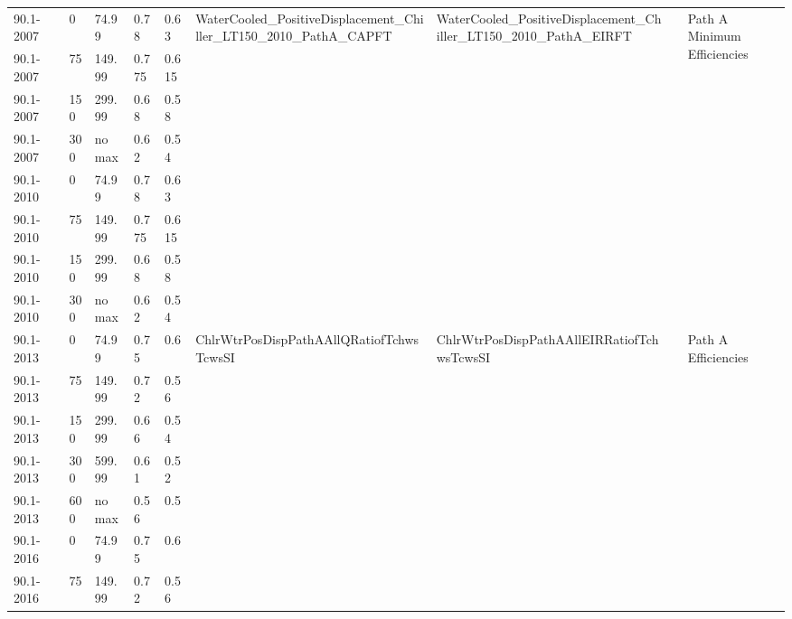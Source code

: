 \begin{table}
\begin{tabular}{|p{0.5in}|p{0.5in}|p{0.4in}|p{0.4in}|p{0.4in}|p{0.4in}|p{0.5in}|p{0.5in}|p{0.5in}|p{0.4in}|}
90.1-2007 &  & 0 & 74.99 & 0.78 & 0.63 &
  \multirow{8}{*}{\parbox{0.5in}{WaterCooled\_PositiveDisplacement\_Chiller\_LT150\_2010\_PathA\_CAPFT}} &
  \multirow{8}{*}{\parbox{0.5in}{WaterCooled\_PositiveDisplacement\_Chiller\_LT150\_2010\_PathA\_EIRFT}} &
   &
  \multirow{8}{*}{\parbox{0.5in}{Path   A Minimum Efficiencies}} \\ \cline{1-1} \cline{3-6}
90.1-2007           &  & 75  & 149.99 & 0.775 & 0.615 &  &  &  &                                        \\ \cline{1-1} \cline{3-6}
90.1-2007           &  & 150 & 299.99 & 0.68  & 0.58  &  &  &  &                                        \\ \cline{1-1} \cline{3-6}
90.1-2007           &  & 300 & no max   & 0.62  & 0.54  &  &  &  &                                        \\ \cline{1-1} \cline{3-6}
90.1-2010           &  & 0   & 74.99  & 0.78  & 0.63  &  &  &  &                                        \\ \cline{1-1} \cline{3-6}
90.1-2010           &  & 75  & 149.99 & 0.775 & 0.615 &  &  &  &                                        \\ \cline{1-1} \cline{3-6}
90.1-2010           &  & 150 & 299.99 & 0.68  & 0.58  &  &  &  &                                        \\ \cline{1-1} \cline{3-6}
90.1-2010           &  & 300 & no max   & 0.62  & 0.54  &  &  &  &                                        \\ \cline{1-1} \cline{3-8} \cline{10-10}
90.1-2013 & &
  0 & 74.99 & 0.75 & 0.6 &
  \multirow{15}{*}{\parbox{0.5in}{ChlrWtr\-PosDisp\-PathAAll\-QRatio\-fTchws\-TcwsSI}} &
  \multirow{15}{*}{\parbox{0.5in}{ChlrWtr\-PosDisp\-PathAAll\-EIRRatio\-fTchws\-TcwsSI}} & &
  \multirow{15}{*}{\parbox{0.5in}{Path   A Efficiencies}} \\ \cline{1-1} \cline{3-6}
90.1-2013 &  & 75  & 149.99 & 0.72 & 0.56 &  &  &  &  \\ \cline{1-1} \cline{3-6}
90.1-2013 &  & 150 & 299.99 & 0.66 & 0.54 &  &  &  &  \\ \cline{1-1} \cline{3-6}
90.1-2013 &  & 300 & 599.99 & 0.61 & 0.52 &  &  &  &  \\ \cline{1-1} \cline{3-6}
90.1-2013 &  & 600 & no max   & 0.56 & 0.5  &  &  &  &  \\ \cline{1-1} \cline{3-6}
90.1-2016 &  & 0   & 74.99  & 0.75 & 0.6  &  &  &  &  \\ \cline{1-1} \cline{3-6}
90.1-2016 &  & 75  & 149.99 & 0.72 & 0.56 &  &  &  &  \\ \cline{1-1} \cline{3-6}

\end{tabular}
\end{table}
